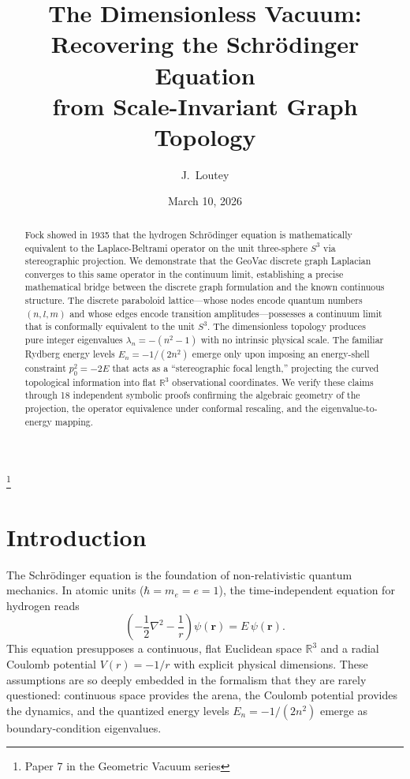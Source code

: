 \documentclass[aps,pra,twocolumn,superscriptaddress,longbibliography]{revtex4-2}
\begin{document}
\title{The Dimensionless Vacuum: Recovering the Schr\"odinger Equation\\from Scale-Invariant Graph Topology}
\thanks{Paper 7 in the Geometric Vacuum series}

\author{J.~Loutey}

\date{March 10, 2026}

\begin{abstract}
Fock showed in 1935 that the hydrogen Schr\"odinger equation is mathematically equivalent to the Laplace-Beltrami operator on the unit three-sphere $S^3$ via stereographic projection. We demonstrate that the GeoVac discrete graph Laplacian converges to this same operator in the continuum limit, establishing a precise mathematical bridge between the discrete graph formulation and the known continuous structure. The discrete paraboloid lattice---whose nodes encode quantum numbers $(n, l, m)$ and whose edges encode transition amplitudes---possesses a continuum limit that is conformally equivalent to the unit $S^3$. The dimensionless topology produces pure integer eigenvalues $\lambda_n = -(n^2 - 1)$ with no intrinsic physical scale. The familiar Rydberg energy levels $E_n = -1/(2n^2)$ emerge only upon imposing an energy-shell constraint $p_0^2 = -2E$ that acts as a ``stereographic focal length,'' projecting the curved topological information into flat $\mathbb{R}^3$ observational coordinates. We verify these claims through 18 independent symbolic proofs confirming the algebraic geometry of the projection, the operator equivalence under conformal rescaling, and the eigenvalue-to-energy mapping.
\end{abstract}

\maketitle


\section{Introduction}
\label{sec:intro}

The Schr\"odinger equation is the foundation of non-relativistic quantum mechanics. In atomic units ($\hbar = m_e = e = 1$), the time-independent equation for hydrogen reads
\begin{equation}
\left( -\frac{1}{2}\nabla^2 - \frac{1}{r} \right) \psi(\mathbf{r}) = E\,\psi(\mathbf{r}).
\label{eq:schrodinger}
\end{equation}
This equation presupposes a continuous, flat Euclidean space $\mathbb{R}^3$ and a radial Coulomb potential $V(r) = -1/r$ with explicit physical dimensions. These assumptions are so deeply embedded in the formalism that they are rarely questioned: continuous space provides the arena, the Coulomb potential provides the dynamics, and the quantized energy levels $E_n = -1/(2n^2)$ emerge as boundary-condition eigenvalues.
\end{document}
